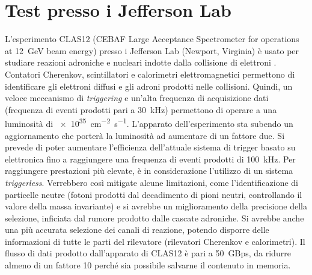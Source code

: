 \documentclass[../main.tex]{subfiles}
\begin{document}
\section{Test presso i Jefferson Lab}
L'esperimento CLAS12 (CEBAF Large Acceptance Spectrometer for operations at \SI{12}{\GeV} beam energy) presso i Jefferson Lab (Newport, Virginia) è usato per studiare reazioni adroniche e nucleari indotte dalla collisione di elettroni \cite{3x3telescope}. Contatori Cherenkov, scintillatori e calorimetri elettromagnetici permettono di identificare gli elettroni diffusi e gli adroni prodotti nelle collisioni. Quindi, un veloce meccanismo di \emph{triggering} e un'alta frequenza di acquisizione dati (frequenza di eventi prodotti pari a \SI{30}{\kilo\hertz}) permettono di operare a una luminosità di \SI{e35}{\cm^{-2}\s^{-1}}.
L'apparato dell'esperimento sta subendo un aggiornamento che porterà la luminosità ad aumentare di un fattore due. Si prevede di poter aumentare l'efficienza dell'attuale sistema di trigger basato su elettronica fino a raggiungere una frequenza di eventi prodotti di \SI{100}{\kilo\hertz}. Per raggiungere prestazioni più elevate, è in considerazione l'utilizzo di un sistema \emph{triggerless}. Verrebbero così mitigate alcune limitazioni, come l'identificazione di particelle neutre (fotoni prodotti dal decadimento di pioni neutri, controllando il valore della massa invariante) e si avrebbe un miglioramento della precisione della selezione, inficiata dal rumore prodotto dalle cascate adroniche. Si avrebbe anche una più accurata selezione dei canali di reazione, potendo disporre delle informazioni di tutte le parti del rilevatore (rilevatori Cherenkov e calorimetri). Il flusso di dati prodotto dall'apparato di CLAS12 è pari a \SI{50}{GBps}, da ridurre almeno di un fattore 10 perché sia possibile salvarne il contenuto in memoria.
\end{document}
